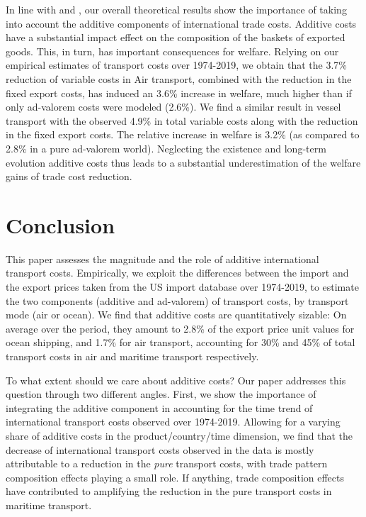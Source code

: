 \documentclass[a4paper,11pt]{article}
\begin{document}
In line with \cite{sorensen2014} and \cite{Irrazabal_2015}, our overall theoretical results show the importance of taking into account the additive components of international trade costs.
Additive costs have a substantial impact effect on the composition of the baskets of exported goods.
This, in turn, has important consequences for welfare.
Relying on our empirical estimates of transport costs over 1974-2019, we obtain that the 3.7\% reduction of variable costs in Air transport, combined with the reduction in the fixed export costs, has induced an 3.6\% increase in welfare, much higher than if only ad-valorem costs were modeled (2.6\%).
We find a similar result in vessel transport with the observed 4.9\% in total variable costs along with the reduction in the fixed export costs.
The relative increase in welfare is 3.2\% (as compared to 2.8\% in a pure ad-valorem world). Neglecting the existence and long-term evolution additive costs thus leads to a substantial underestimation of the welfare gains of trade cost reduction.


\section{Conclusion \label{sec:conclu}}

This paper assesses the magnitude and the role of additive international transport costs. Empirically, we exploit the differences between the import and the export prices taken from the US import database over 1974-2019, to estimate the two components (additive and ad-valorem) of transport costs, by transport mode (air or ocean). We find that additive costs are quantitatively sizable: On average over the period, they amount to 2.8\% of the export price unit values for ocean shipping, and 1.7\% for air transport, accounting for 30\% and 45\% of total transport costs in air and maritime transport respectively.

To what extent should we care about additive costs? Our paper addresses this question through two different angles. First, we show the importance of integrating the additive component in accounting for the time trend of international transport costs observed over 1974-2019. Allowing for a varying share of additive costs in the product/country/time dimension, we find that the decrease of international transport costs observed in the data is mostly attributable to a reduction in the \textit{pure} transport costs, with trade pattern composition effects playing a small role. If anything, trade composition effects have contributed to amplifying the reduction in the pure transport costs in maritime transport.
\end{document}
